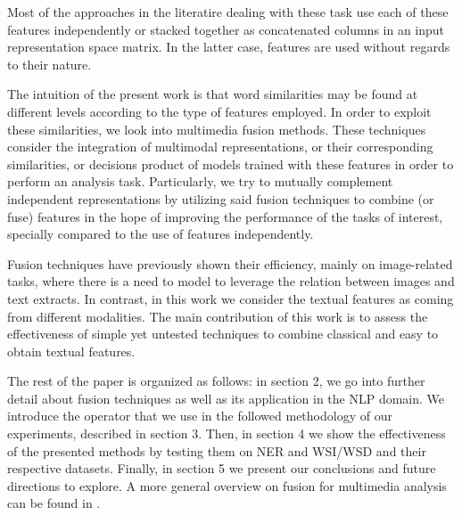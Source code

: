 \documentclass[11pt]{article}
\begin{document}

Most of the approaches in the literatire dealing with these task use each of these features independently or stacked together as concatenated columns in an input representation space matrix. In the latter case, features are used without regards to their nature. 

The intuition of the present work is that word similarities may be found at different levels according to the type of features employed. In order to exploit these similarities, we look into multimedia fusion methods. These techniques consider the integration of multimodal representations, or their corresponding similarities, or  decisions product of models trained with these features in order to perform an analysis task.  Particularly, we try to mutually complement independent representations by utilizing said fusion techniques to combine (or fuse) features in the hope of improving the performance of the tasks of interest, specially compared to the use of features independently. 

Fusion techniques have previously shown their efficiency, mainly on image-related tasks, where there is a need to model to leverage the relation  between images and text extracts.
%
%
In contrast, in this work we consider the textual features as coming from different modalities. The main contribution of this work is to assess the effectiveness of simple yet untested techniques to combine classical and easy to obtain textual features. 

The rest of the paper is organized as follows: in section 2, we go into further detail about fusion techniques as well as its application in the NLP domain. We introduce the operator that we use in the followed methodology of our experiments, described in section 3. Then, in section 4 we show the effectiveness of the presented methods by testing them on NER and WSI/WSD and their respective datasets. Finally, in section 5 we present our conclusions and future directions to explore. A more general overview on fusion for multimedia analysis can be found in \cite{AtreyHEK10}.
\end{document}

